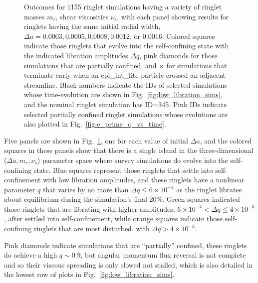 \documentclass[preprint]{aastex62}
\begin{document}
\begin{figure}
    \caption{
        \label{fig:sim_grid_da}
        Outcomes for 1155 ringlet simulations having a variety of ringlet
        masses $m_r$, shear viscosities $\nu_s$, with each panel showing results
        for ringlets having the same initial radial width,
        $\Delta a=0.0003, 0.0005, 0.0008, 0.0012$, or  $0.0016$. Colored squares indicate
        those ringlets that evolve into the self-confining state with the indicated libration
        amplitudes $\Delta q$, pink diamonds for those simulations that are partially confined, 
        and $\times$ for simulations that terminate early when an epi\_int\_lite particle crossed an 
        adjacent streamline. Black numbers indicate the IDs of selected simulations whose time-evolution
        are shown in Fig.\ \ref{fig:low_libration_sims}, and the nominal ringlet
        simulation has ID=345. Pink IDs indicate selected partially confined ringlet simulations
        whose evolutions are also plotted in Fig.\ \ref{fig:e_prime_q_vs_time}.
    }
\end{figure}

Five panels are shown in Fig.\ \ref{fig:sim_grid_da},  one for each value of initial $\Delta a$,
and the colored squares in these panels show that there is a single 
island in the three-dimensional ($\Delta a, m_r, \nu_s$) parameter space where survey
simulations do evolve into the self-confining state. Blue squares represent those ringlets
that settle into self-confinement with low libration amplitudes, and these ringlets
have a nonlinear parameter $q$ that varies by no more than $\Delta q \le 6\times10^{-4}$ 
as the ringlet librates about equilibrium during the simulation's final 20\%.
Green squares indicated those ringlets that are librating with higher amplitudes, 
$6\times10^{-4} < \Delta q \le 4\times10^{-3}$, after settled into self-confinement, 
while orange squares indicate those self-confining ringlets that are most disturbed,
with $\Delta q > 4\times10^{-3}$.

Pink diamonds indicate simulations that are ``partially'' confined, these ringlets
do achieve a high $q\sim0.9$, but angular momentum flux reversal is not complete
and so their viscous spreading is only slowed not stalled, which 
is also detailed in the lowest row of plots in Fig.\ \ref{fig:low_libration_sims}.
\end{document}
